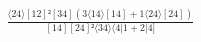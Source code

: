 \documentclass[varwidth, border=5pt]{standalone}
\begin{document}
\begin{my}
$\begin{gathered}
\scriptscriptstyle\frac{⟨24⟩[12]²[34](3⟨14⟩[14]+1⟨24⟩[24])}{[14][24]²⟨34⟩⟨4|1+2|4]}
\end{gathered}$
\end{my}
\end{document}

